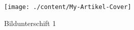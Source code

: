 \begin{refsection}
\begin{figure}[t]
  \begin{center}
  \texttt{[image: ./content/My-Artikel-Cover]}
  \caption{Bildunterschift 1}\label{fig:label1}		%
  \end{center}
\end{figure}

\printbibliography
\end{refsection}

